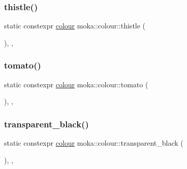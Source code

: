 \subsubsection{\texorpdfstring{thistle()}{thistle()}}
{\footnotesize\ttfamily static constexpr \mbox{\hyperlink{classmoka_1_1colour}{colour}} moka\+::colour\+::thistle (\begin{DoxyParamCaption}{ }\end{DoxyParamCaption})\hspace{0.3cm}{\ttfamily [inline]}, {\ttfamily [static]}, {\ttfamily [noexcept]}}

\mbox{\label{classmoka_1_1colour_ab4aaa71a65f87529dd18d088f4204559}} 
\subsubsection{\texorpdfstring{tomato()}{tomato()}}
{\footnotesize\ttfamily static constexpr \mbox{\hyperlink{classmoka_1_1colour}{colour}} moka\+::colour\+::tomato (\begin{DoxyParamCaption}{ }\end{DoxyParamCaption})\hspace{0.3cm}{\ttfamily [inline]}, {\ttfamily [static]}, {\ttfamily [noexcept]}}

\mbox{\label{classmoka_1_1colour_a9b7dc38464956134c0fd56f4efcd69c8}} 
\subsubsection{\texorpdfstring{transparent\_black()}{transparent\_black()}}
{\footnotesize\ttfamily static constexpr \mbox{\hyperlink{classmoka_1_1colour}{colour}} moka\+::colour\+::transparent\+\_\+black (\begin{DoxyParamCaption}{ }\end{DoxyParamCaption})\hspace{0.3cm}{\ttfamily [inline]}, {\ttfamily [static]}, {\ttfamily [noexcept]}}

\mbox{\label{classmoka_1_1colour_a011d812d61b7f9dbcf56a53454daa144}} 
